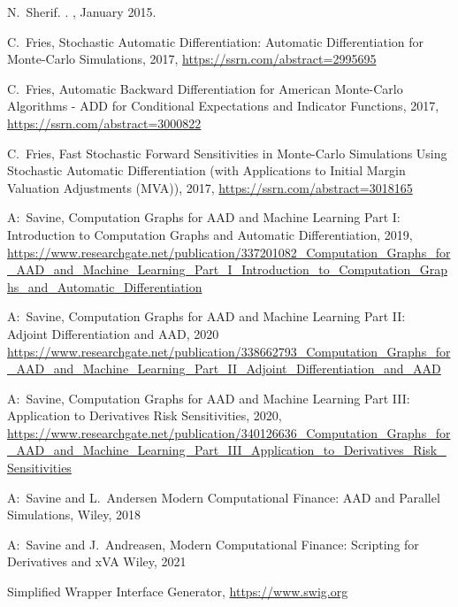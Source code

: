 \documentclass[12pt, a4paper]{report}
\begin{document}
\begin{thebibliography}{*}
N.~Sherif.
.
, January 2015.

  C.~Fries, Stochastic Automatic Differentiation: Automatic Differentiation for Monte-Carlo Simulations, 2017, \url{https://ssrn.com/abstract=2995695}

  C.~Fries, Automatic Backward Differentiation for American Monte-Carlo Algorithms - ADD for Conditional Expectations and Indicator Functions, 2017, \url{https://ssrn.com/abstract=3000822}

  C.~Fries, Fast Stochastic Forward Sensitivities in Monte-Carlo Simulations Using Stochastic Automatic Differentiation (with Applications to Initial Margin Valuation Adjustments (MVA)), 2017, \url{https://ssrn.com/abstract=3018165}

 A:~Savine,
  Computation Graphs for AAD and Machine Learning Part I: \\
  Introduction to Computation Graphs and Automatic Differentiation, 2019,\\
  \url{https://www.researchgate.net/publication/337201082_Computation_Graphs_for_AAD_and_Machine_Learning_Part_I_Introduction_to_Computation_Graphs_and_Automatic_Differentiation}

 A:~Savine,
  Computation Graphs for AAD and Machine Learning Part II: \\
  Adjoint Differentiation and AAD, 2020\\
  \url{https://www.researchgate.net/publication/338662793_Computation_Graphs_for_AAD_and_Machine_Learning_Part_II_Adjoint_Differentiation_and_AAD}

 A:~Savine,
  Computation Graphs for AAD and Machine Learning Part III: \\
  Application to Derivatives Risk Sensitivities, 2020, \\
  \url{https://www.researchgate.net/publication/340126636_Computation_Graphs_for_AAD_and_Machine_Learning_Part_III_Application_to_Derivatives_Risk_Sensitivities}

 A:~Savine and L.~Andersen
  Modern Computational Finance: AAD and Parallel Simulations,
  Wiley, 2018

 A:~Savine and J.~Andreasen,
  Modern Computational Finance: Scripting for Derivatives and xVA
  Wiley, 2021

 Simplified Wrapper Interface Generator, \url{https://www.swig.org}
  
\end{thebibliography}
\end{document}
